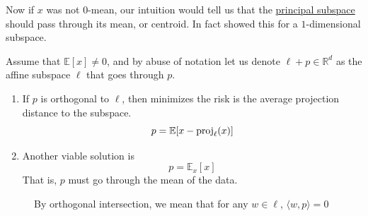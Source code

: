   Now if $x$ was not $0$-mean, our intuition would tell us that the \hyperref[def:principal-subspace]{principal subspace} should pass through its mean, or centroid. In fact \cite{1901pearson} showed this for a $1$-dimensional subspace. 

  \begin{lemma}
    \label{thm:principal-subspace-must-intersect-mean}
    Assume that $\mathbb{E}[x] \neq 0$, and by abuse of notation let us denote $\ell + p \in \mathbb{R}^d$ as the affine subspace $\ell$ that goes through $p$. 
    \begin{enumerate}
      \item If $p$ is orthogonal to $\ell$, then minimizes the risk is the average projection distance to the subspace. 
      \begin{equation}
        p = \mathbb{E}[x - \operatorname{proj}_\ell (x)]
      \end{equation}

      \item Another viable solution is 
        \begin{equation}
          p = \mathbb{E}_x [x]
        \end{equation}
        That is, $p$ must go through the mean of the data. 
    \end{enumerate}

    \begin{figure}[H]
      \centering 
      \caption{By orthogonal intersection, we mean that for any $w \in \ell$, $\langle w, p \rangle = 0$} 
    \end{figure}
  \end{lemma}
